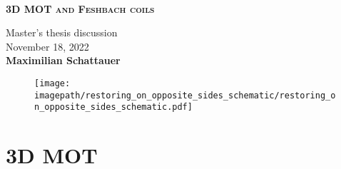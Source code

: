 \newcommand{\textpath}{../text}
\newcommand{\imagepath}{}




\begin{frame}
	\begin{center}
		\begin{block}
			{\centering \\
				\medskip
				\textbf{\textsc{3D MOT and Feshbach coils}}\\
				\medskip}
		\end{block}

		\bigskip

		Master's thesis discussion\\
		\medskip
		November 18, 2022\\

		\vspace{1cm}
		\textbf{Maximilian Schattauer}
	\end{center}
\end{frame}

\renewcommand{\imagepath}{\textpath/30-mot/img}

\begin{frame}
	\begin{figure}
        \raggedleft
        \texttt{[image: \\imagepath/restoring\_on\_opposite\_sides\_schematic/restoring\_on\_opposite\_sides\_schematic.pdf]}
    \end{figure}
    \section{3D MOT}
\end{frame}


